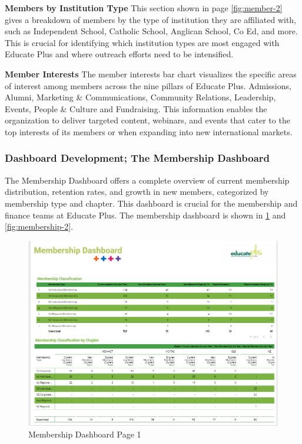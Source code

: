 \documentclass[11pt,a4paper,]{article}
\begin{document}
\textbf{Members by Institution Type}
This section shown in page \ref{fig:member-2} gives a breakdown of members by the type of institution they are affiliated with, such as Independent School, Catholic School, Anglican School, Co Ed, and more. This is crucial for identifying which institution types are most engaged with Educate Plus and where outreach efforts need to be intensified.

\textbf{Member Interests}
The member interests bar chart visualizes the specific areas of interest among members across the nine pillars of Educate Plus. Admissions, Alumni, Marketing \& Communications, Community Relations, Leadership, Events, People \& Culture and Fundraising. This information enables the organization to deliver targeted content, webinars, and events that cater to the top interests of its members or when expanding into new international markets.

\subsubsection{Dashboard Development; The Membership Dashboard}\label{dashboard-development-the-membership-dashboard}

The Membership Dashboard offers a complete overview of current membership distribution, retention rates, and growth in new members, categorized by membership type and chapter. This dashboard is crucial for the membership and finance teams at Educate Plus. The membership dashboard is shown in \ref{fig:membership-1} and \ref{fig:membership-2}.

\begin{figure}[H]

{\centering \includegraphics[width=0.9\linewidth]{Images/membership_dashboard_page_1} 

}

\caption{Membership Dashboard Page 1}\label{fig:membership-1}
\end{figure}
\end{document}
